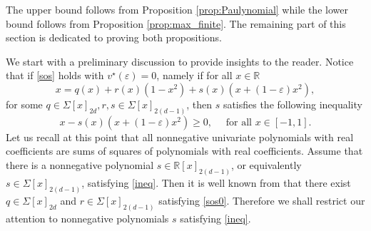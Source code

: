 \documentclass[a4paper,12pt]{article}
\newcommand{\R}{\mathbb{R}} %
\begin{document}
The upper bound follows from Proposition \ref{prop:Paulynomial} while the lower bound follows from Proposition \ref{prop:max_finite}. 
The remaining part of this section is dedicated to proving both propositions. 

We start with a preliminary discussion to provide insights to the reader. 
Notice that if \eqref{sos} holds with $v^\star(\varepsilon) = 0$, namely if for all $x \in \R$ 
\begin{equation}
\label{sos0}
x = q(x) + r(x) (1-x^2) + s(x) (x+(1-\varepsilon)x^2) ,
\end{equation}
for some $q \in \Sigma[x]_{2d}, r,s \in \Sigma[x]_{2(d-1)}$, then $s$ satisfies the following inequality  
\begin{equation}\label{ineq}
x-s(x)(x+(1-\varepsilon)x^2) \geq 0, \quad \text{ for all } x \in [-1,1]. 
\end{equation}
%
{Let us recall at this point that all nonnegative univariate polynomials with real coefficients are sums of squares of polynomials with real coefficients. }
Assume that there is a nonnegative polynomial $s \in \R[x]_{2(d-1)}$, or equivalently $s \in \Sigma[x]_{2(d-1)}$, satisfying \eqref{ineq}. 
Then it is well known from \cite{fekete35} that there exist $q \in \Sigma[x]_{2d}$ and $r \in \Sigma[x]_{2(d-1)}$ satisfying \eqref{sos0}. 
Therefore we shall restrict our attention to nonnegative polynomials $s$ satisfying \eqref{ineq}. 

\def\vareps{0.5}
\def\inveps{2}
\def\onehalfeps{0.666}
\end{document}
